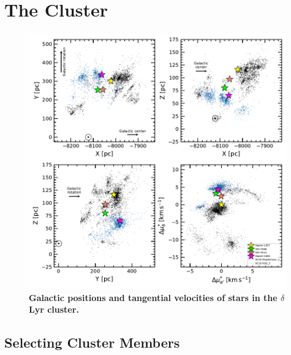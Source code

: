 \documentclass[12pt,modern,tighten]{aastex63}
\begin{document}
\section{The Cluster}
\label{sec:cluster}

\begin{figure}[t]
	\begin{center}
		\leavevmode
		\includegraphics[width=0.99\textwidth]{f1.pdf}
	\end{center}
	\vspace{-0.7cm}
	\caption{
    {\bf Galactic positions  and tangential velocities of stars in the
    $\delta$\,Lyr cluster.} 
		\label{fig:XYZvtang}
	}
\end{figure}

\subsection{Selecting Cluster Members}
\label{sec:kinematicselection}
\end{document}
